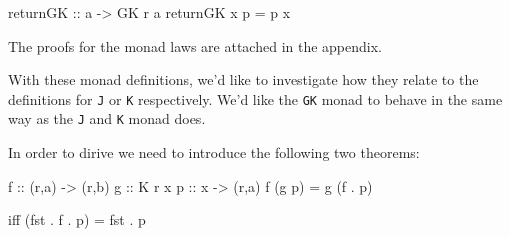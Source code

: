 \documentclass[runningheads]{llncs}
\begin{document}
\begin{code}
returnGK :: a -> GK r a
returnGK x p = p x
\end{code}

The proofs for the monad laws are attached in the appendix.

With these monad definitions, we'd like to investigate how they relate
to the definitions for \texttt{J} or \texttt{K} respectively. We'd like
the \texttt{GK} monad to behave in the same way as the \texttt{J} and
\texttt{K} monad does.

In order to dirive we need to introduce the following two theorems:

\begin{theorem}[Theorem 1]
\begin{haskell}
f :: (r,a) -> (r,b)
g :: K r x
p :: x -> (r,a)
f (g p) = g (f . p)
\end{haskell}
iff (fst . f . p) = fst . p

\end{theorem}
\end{document}
